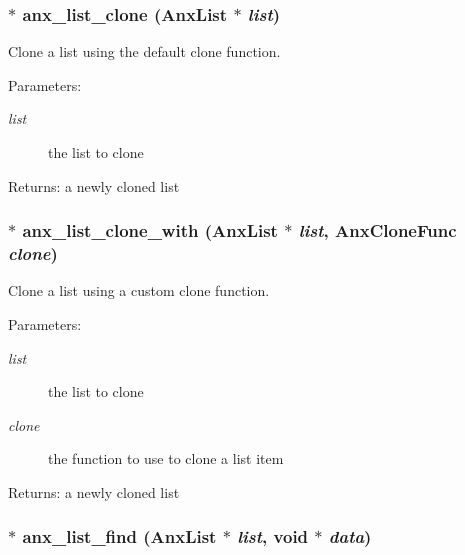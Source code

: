 \subsubsection{$\ast$ anx\_\-list\_\-clone ({\bf Anx\-List} $\ast$ {\em list})}\label{anx__list_8h_a2}


Clone a list using the default clone function. 

\begin{Desc}
\item[Parameters:]
\begin{description}
\item[{\em list}]the list to clone \end{description}
\end{Desc}
\begin{Desc}
\item[Returns:]a newly cloned list \end{Desc}
\subsubsection{$\ast$ anx\_\-list\_\-clone\_\-with ({\bf Anx\-List} $\ast$ {\em list}, {\bf Anx\-Clone\-Func} {\em clone})}\label{anx__list_8h_a3}


Clone a list using a custom clone function. 

\begin{Desc}
\item[Parameters:]
\begin{description}
\item[{\em list}]the list to clone \item[{\em clone}]the function to use to clone a list item \end{description}
\end{Desc}
\begin{Desc}
\item[Returns:]a newly cloned list \end{Desc}
\subsubsection{$\ast$ anx\_\-list\_\-find ({\bf Anx\-List} $\ast$ {\em list}, void $\ast$ {\em data})}\label{anx__list_8h_a9}


